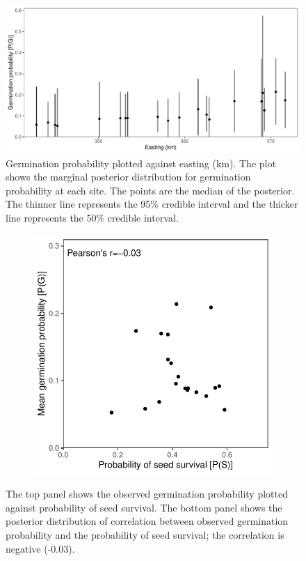 \documentclass[12pt, oneside, titlepage]{article}   	%
\begin{document}
 \begin{figure}[h]
   \centering
       \includegraphics[page=1,width=1\textwidth]{../figures/spatial-g1.pdf}  
    \caption{ Germination probability plotted against easting (km). The plot shows the marginal posterior distribution for germination probability at each site. The points are the median of the posterior. The thinner line represents the 95\% credible interval and the thicker line represents the 50\% credible interval. }
 \label{fig:test}
\end{figure}

 \begin{figure}
\centering
\begin{subfigure}[h]{.65\textwidth}
\centering
       \includegraphics[page=1,width=1\textwidth]{../figures/germ_surv_correlation.pdf}  
\end{subfigure}
 \caption{ The top panel shows the observed germination probability plotted against probability of seed survival. The bottom panel shows the posterior distribution of correlation between observed germination probability and the probability of seed survival; the correlation is negative (-0.03). }
  \label{fig:germ_surv_correlation}
 \end{figure}
\end{document}
